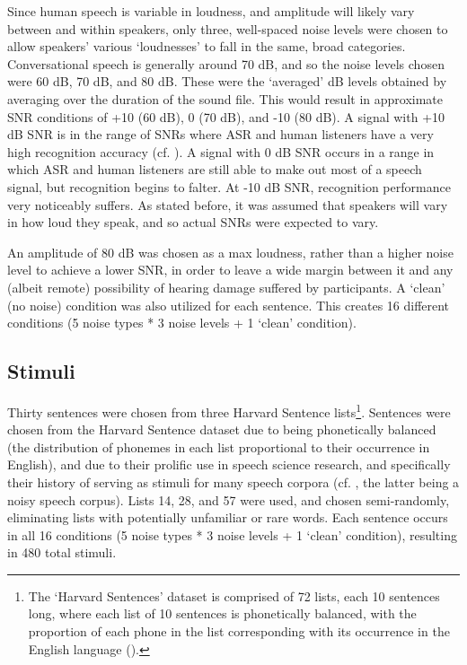 Since human speech is variable in loudness, and amplitude will likely vary between and within speakers, only three, well-spaced noise levels were chosen to allow speakers' various `loudnesses' to fall in the same, broad categories.  Conversational speech is generally around 70 dB, and so the noise levels chosen were 60 dB, 70 dB, and 80 dB.  These were the `averaged' dB levels obtained by averaging over the duration of the sound file.  This would result in approximate SNR conditions of +10 (60 dB), 0 (70 dB), and -10 (80 dB).  A signal with +10 dB SNR is in the range of SNRs where ASR and human listeners have a very high recognition accuracy (cf. \cite{braun:16,gilbert:13}).  A signal with 0 dB SNR occurs in a range in which ASR and human listeners are still able to make out most of a speech signal, but recognition begins to falter.  At -10 dB SNR, recognition performance very noticeably suffers.  As stated before, it was assumed that speakers will vary in how loud they speak, and so actual SNRs were expected to vary.

An amplitude of 80 dB was chosen as a max loudness, rather than a higher noise level to achieve a lower SNR, in order to leave a wide margin between it and any (albeit remote) possibility of hearing damage suffered by participants.  A `clean' (no noise) condition was also utilized for each sentence.  This creates 16 different conditions (5 noise types * 3 noise levels + 1 `clean' condition).  

\subsection{Stimuli}
Thirty sentences were chosen from three Harvard Sentence lists\footnote{The `Harvard Sentences' dataset is comprised of 72 lists, each 10 sentences long, where each list of 10 sentences is phonetically balanced, with the proportion of each phone in the list corresponding with its occurrence in the English language (\cite{harvardSents}).}.  Sentences were chosen from the Harvard Sentence dataset due to being phonetically balanced (the distribution of phonemes in each list proportional to their occurrence in English), and due to their prolific use in speech science research, and specifically their history of serving as stimuli for many speech corpora (cf. \cite{kabal:02,hu:07}, the latter being a noisy speech corpus).  Lists 14, 28, and 57 were used, and chosen semi-randomly, eliminating lists with potentially unfamiliar or rare words.  Each sentence occurs in all 16 conditions (5 noise types * 3 noise levels + 1 `clean' condition), resulting in 480 total stimuli.

